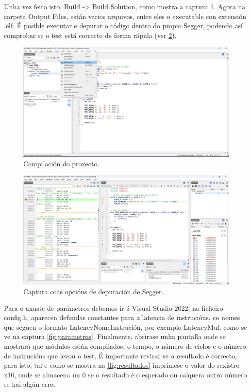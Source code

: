  Unha vez feito isto,  Build -> Build Solution, como mostra a captura \ref{fig:compilar}. Agora na carpeta Output Files, están varios arquivos, entre eles o executable con extensión .elf. É posible executar e depurar o código dentro do propio Segger, podendo así comprobar se o test está correcto de forma rápida (ver \ref{fig:cap3}).

\begin{figure}[hp!]
  \centering
  \includegraphics[width=\textwidth]{imaxes/Cap_3_Comp.png}
  \caption{Compilación do proxecto.}
  \label{fig:compilar}
\end{figure}

\begin{figure}[hp!]
  \centering
  \includegraphics[width=\textwidth]{imaxes/Cap_4_Debug.png}
  \caption{Captura coas opcións de depuración de Segger.}
  \label{fig:cap3}
\end{figure}

Para o axuste de parámetros debemos ir á Visual Studio 2022, no ficheiro config.h, aparecen definidas constantes para a latencia de instrucións, co nomes que seguen o formato LatencyNomeInstrución, por exemplo LatencyMul, como se ve na captura \ref{fig:parametros}. Finalmente, abrirase unha pantalla onde se mostrará que módulos están compilados, o tempo, o número de ciclos e o número de instrucións que levou o test. É importante revisar se o resultado é correcto, para isto, tal e como se mostra na \ref{fig:resultados} imprímese o valor do rexistro x10, onde se almacena un 0 se o resultado é o esperado ou calquera outro número se hai algún erro.

